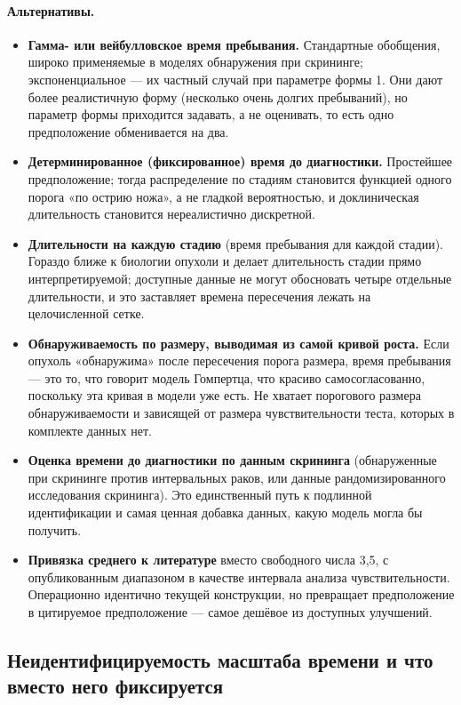\documentclass[12pt,a4paper]{article}
\newcommand{\alt}[1]{\paragraph{Альтернативы.} #1}
\begin{document}
\alt{\begin{itemize}[nosep]
  \item \textbf{Гамма- или вейбулловское время пребывания.} Стандартные обобщения, широко применяемые в
        моделях обнаружения при скрининге; экспоненциальное --- их частный случай при параметре формы 1. Они
        дают более реалистичную форму (несколько очень долгих пребываний), но параметр формы приходится
        задавать, а не оценивать, то есть одно предположение обменивается на два.
  \item \textbf{Детерминированное (фиксированное) время до диагностики.} Простейшее предположение; тогда
        распределение по стадиям становится функцией одного порога «по острию ножа», а не гладкой
        вероятностью, и доклиническая длительность становится нереалистично дискретной.
  \item \textbf{Длительности на каждую стадию} (время пребывания для каждой стадии). Гораздо ближе к
        биологии опухоли и делает длительность стадии прямо интерпретируемой; доступные данные не могут
        обосновать четыре отдельные длительности, и это заставляет времена пересечения лежать на целочисленной
        сетке.
  \item \textbf{Обнаруживаемость по размеру, выводимая из самой кривой роста.} Если опухоль «обнаружима»
        после пересечения порога размера, время пребывания --- это то, что говорит модель Гомпертца, что
        красиво самосогласованно, поскольку эта кривая в модели уже есть. Не хватает порогового размера
        обнаруживаемости и зависящей от размера чувствительности теста, которых в комплекте данных нет.
  \item \textbf{Оценка времени до диагностики по данным скрининга} (обнаруженные при скрининге против
        интервальных раков, или данные рандомизированного исследования скрининга). Это единственный путь к
        подлинной идентификации и самая ценная добавка данных, какую модель могла бы получить.
  \item \textbf{Привязка среднего к литературе} вместо свободного числа 3,5, с опубликованным диапазоном в
        качестве интервала анализа чувствительности. Операционно идентично текущей конструкции, но
        превращает предположение в цитируемое предположение --- самое дешёвое из доступных улучшений.
\end{itemize}}

\subsection{Неидентифицируемость масштаба времени и что вместо него фиксируется}
\label{sec:nonident}
\end{document}
